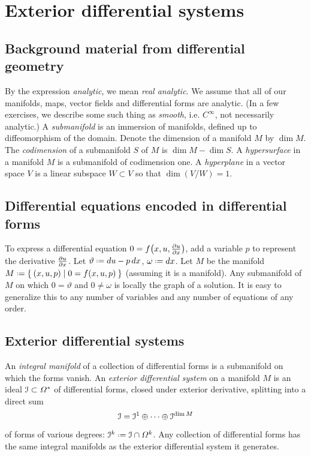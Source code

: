 \chapter{Exterior differential systems}\label{chapter:eds}

\section{Background material from differential geometry}
By the expression \emph{analytic}, we mean \emph{real analytic}.
We assume that all of our manifolds, maps, vector fields and differential forms are analytic.
(In a few exercises, we describe some such thing as \emph{smooth}, i.e. \(C^{\infty}\), not necessarily analytic.)
A \emph{submanifold} is an immersion of manifolds, defined up to diffeomorphism of the domain.
Denote the dimension of a manifold \(M\) by \(\dim M\).
The \emph{codimension} of a submanifold \(S\) of \(M\) is \(\dim M - \dim S\).
A \emph{hypersurface} in a manifold \(M\) is a submanifold of codimension one.
A \emph{hyperplane} in a vector space \(V\) is a linear subspace \(W\subset V\) so that \(\dim (V/W)=1\).


\section{Differential equations encoded in differential forms}
To express a differential equation \(0=f\of{x,u,\pderiv{u}{x}}\), add a variable \(p\) to represent the derivative \(\pderiv{u}{x}\).
Let \(\vartheta\defeq du-p \, dx\), \(\omega\defeq dx\). Let \(M\) be the manifold \(M\defeq\Set{(x,u,p)|0=f\of{x,u,p}}\) (assuming it is a manifold).
Any submanifold of \(M\) on which \(0=\vartheta\) and \(0\ne \omega\) is locally the graph of a solution.
It is easy to generalize this to any number of variables and any number of equations of any order.

\section{Exterior differential systems}
An \emph{integral manifold} of a collection of differential forms is a submanifold on which the forms vanish.
An \emph{exterior differential system} on a manifold \(M\) is an ideal \(\mathcal{I} \subset \Omega^*\) of differential forms, closed under exterior derivative, splitting into a direct sum
\[
\mathcal{I}=\mathcal{I}^1 \oplus \dots \oplus \mathcal{I}^{\dim M}
\]
of forms of various degrees: \(\II^k \defeq \II \cap \Omega^k\).
Any collection of differential forms has the same integral manifolds as the exterior differential system it generates.

